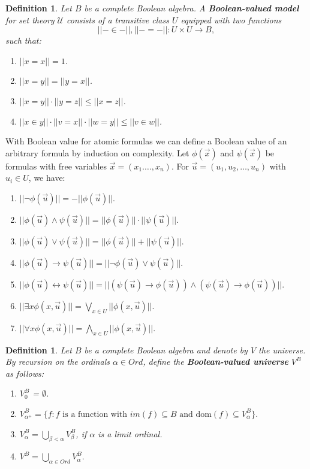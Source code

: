 \documentclass[10pt,longbibliography]{article}
\newtheorem{Def}[Theo]{Definition}
\newcommand{\us}{\overset{\to}{u}}
\newcommand{\x}{\overset{\to}{x}}
\begin{document}
\begin{Def}\label{Booleanvaluedmodeldef}
	Let $B$ be a complete Boolean algebra. A \textbf{Boolean-valued model} for set theory $\mathcal{U}$ consists of a transitive class $U$ equipped with two functions $$||-\in-||, || - = - ||: U \times U \to B,$$ such that:
	\begin{enumerate}
		\item $||x = x||= 1$.
		\item $||x=y|| = ||y=x||$.
		\item $||x = y|| \cdot ||y=z|| \leq ||x = z||$.
		\item $||x \in y|| \cdot ||v = x|| \cdot ||w=y|| \leq ||v \in w||$.
		
	\end{enumerate}
\end{Def}
With Boolean value for atomic formulas we can define a Boolean value of an arbitrary formula by induction on complexity. Let $\phi(\x)$ and $\psi(\x)$ be formulas with free variables $\x = (x_{1}.\dots, x_{n}).$ For $ \us =(u_{1},u_{2},\dots, u_{n})$ with $u_{i} \in U$, we have:
\begin{enumerate}
	
	\item $||\neg \phi(\us)|| = -||\phi(\us)||$.
	\item $||\phi(\us) \land \psi(\us)|| = ||\phi(\us)||\cdot ||\psi(\us)||$.
	\item $||\phi(\us) \lor \psi(\us)|| = ||\phi(\us)||+ ||\psi(\us)||$.
	\item $||\phi(\us) \rightarrow \psi(\us)|| = ||\neg\phi(\us)\lor \psi(\us)||$.
	\item $||\phi(\us) \leftrightarrow \psi(\us)|| = ||(\psi(\us)\to \phi(\us))\land (\psi(\us)\to \phi(\us))||$.
	
	\item $||\exists x \phi(x,\us)|| = \underset{x \in U}{\bigvee}||\phi(x,\us)||$.
	
	\item $||\forall x \phi(x,\us)|| = \underset{x \in U}{\bigwedge}||\phi(x,\us)||$.
\end{enumerate}


\begin{Def}
	
	Let $B$ be a complete Boolean algebra and denote by $V$ the  \emph{universe}. By recursion on the ordinals $\alpha \in Ord$, define the \textbf{Boolean-valued universe} $V^{B}$ as follows:
	
	\begin{enumerate}\label{BooleanvalueinV^B}
		\item $V_{0}^{B}$ = $\emptyset$.
		\item $V_{\alpha^{+}}^{B} = \{ f: f \text{ is a function with }im(f) \subseteq B\text{ and dom}(f) \subseteq V_{\alpha}^{B}\}.$
		\item $V_{\alpha}^{B} = \underset{\beta < \alpha}{\bigcup}V_{\beta}^{B}$, if $\alpha$ is a limit ordinal.
		\item $V^B = \underset{\alpha \in Ord}{\bigcup} V_{\alpha}^{B}.$ 
	\end{enumerate}
\end{Def}
\end{document}
